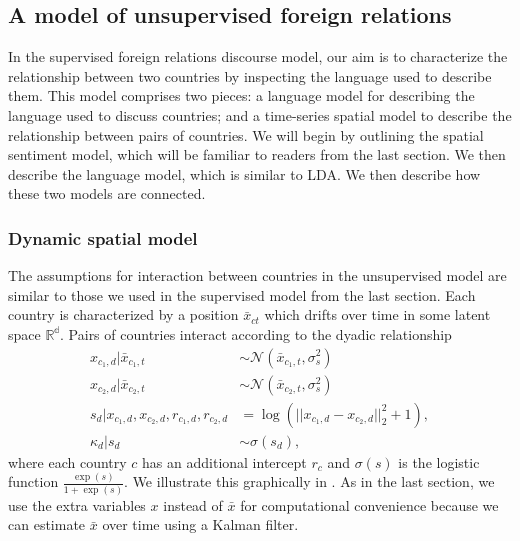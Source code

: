 \subsection{A model of unsupervised foreign relations}
In the supervised foreign relations discourse model, our aim is to
characterize the relationship between two countries by inspecting the
language used to describe them.  This model comprises two pieces: a
language model for describing the language used to discuss countries;
and a time-series spatial model to describe the relationship between
pairs of countries.  We will begin by outlining the spatial sentiment
model, which will be familiar to readers from the last section.  We
then describe the language model, which is similar to LDA.  We then
describe how these two models are connected.

\subsubsection*{Dynamic spatial model}
The assumptions for interaction between countries in the unsupervised
model are similar to those we used in the supervised model from the
last section.  Each country is characterized by a position $\bar
x_{ct}$ which drifts over time in some latent space $\mathbb{R^d}$.
Pairs of countries interact according to the dyadic relationship
\begin{align}
  x_{c_1,d} | \bar x_{c_1,t} & \sim \mathcal{N}(\bar x_{c_1, t}, \sigma_s^2) \nonumber \\
  x_{c_2,d} | \bar x_{c_2,t} & \sim \mathcal{N}(\bar x_{c_2, t}, \sigma_s^2) \nonumber \\
  s_d | x_{c_1,d}, x_{c_2,d}, r_{c_1,d}, r_{c_2,d} & = \log( || x_{c_1,d} - x_{c_2,d} ||_2^2 + 1), \nonumber \\
  \kappa_d | s_d & \sim \sigma(s_d),
\end{align}
where each country $c$ has an additional intercept $r_c$ and
$\sigma(s)$ is the logistic function $\frac{\exp(s)}{1 + \exp(s)}$.
We illustrate this graphically in .  As in the
last section, we use the extra variables $x$ instead of $\bar x$ for
computational convenience because we can estimate $\bar x$ over time
using a Kalman filter.

